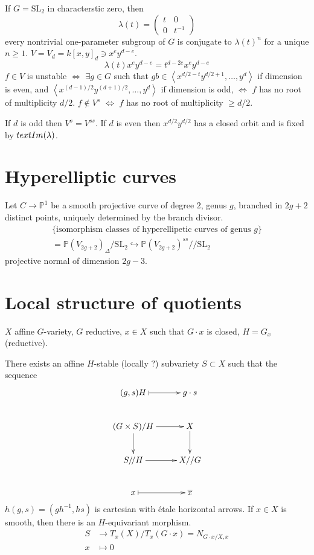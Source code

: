 \begin{example}
\label{example-stable-points-for-SL2-acting-on-degree-d-polynomials}
If $G=\text{SL}_2$ in characterstic zero, then
$$
\lambda(t)=\begin{pmatrix}
t&0\\ 
0&t^{-1}
\end{pmatrix}
$$
every nontrivial one-parameter subgroup of $G$ is conjugate to $\lambda(t)^n$
for a unique $n \geq 1$. $V=V_d=k[x,y]_d\ni x^e y^{d-e}$.
$$
\lambda(t) x^e y^{d-e}=t^{d-2e}x^ey^{d-e}
$$
$f \in V$ is unstable $\iff$ $\exists g \in G$ such that $gb \in \left<
x^{d/2-t}y^{d/2+1},\ldots, y^d\right>$ if dimension is even, and $
\left<x^{(d-1)/2}y^{(d+1)/2},\ldots, y^d\right>$ if dimension is odd, $\iff$
$f$ has no root of multiplicity $d/2$. $f \not \in V^s$ $\iff$ $f$ has no root
of multiplicity $\geq d/2$.

If $d$ is odd then $V^s=V^{ss}$. If $d$ is even then $x^{d/2}y^{d/2}$ has a
closed orbit and is fixed by $\\text{Im}(\lambda)$.
\end{example}

\section{Hyperelliptic curves}
\label{section-hyperelliptic-curves}

Let $C \to \mathbb{P}^1$ be a smooth projective curve of degree $2$, genus $g$,
branched in $2g+2$ distinct points, uniquely determined by the branch divisor.
\begin{gather*}
\{\text{isomorphism classes of hyperellipetic curves of genus $g$}\}\\
=\mathbb{P}(V_{2g+2})_\Delta/\text{SL}_2 \hookrightarrow
\mathbb{P}(V_{2g+2})^{ss}/\!/\text{SL}_2
\end{gather*}
projective normal of dimension $2g-3$.

\section{Local structure of quotients}
\label{section-local-structure-of-quotients}
$X$ affine $G$-variety, $G$ reductive, $x\in X$ such that $G\cdot x$ is closed,
$H=G_x$ (reductive).

\begin{theorem}
\label{theorem-}
There exists an affine $H$-stable (locally ?) subvariety $S \subset X$ such that
the sequence
$$
\xymatrix{
(g,s)H\ar@{|->}[r]&g\cdot s\\
(G\times S)/H\ar[d]\ar[r]&  X\ar[d]\\
S/\!/H\ar[r]&  X//G\\
x\ar@{|->}[r]&\overline{x}
}
$$
$h(g,s)=(gh^{-1},hs)$ is cartesian with étale horizontal arrows. If $x \in X$ is
smooth, then there is an $H$-equivariant morphism.
\begin{align*}
S &\longrightarrow T_x(X)/T_x(G\cdot x)=N_{G\cdot x/X,x} \\
x &\longmapsto 0
\end{align*}
\end{theorem}


